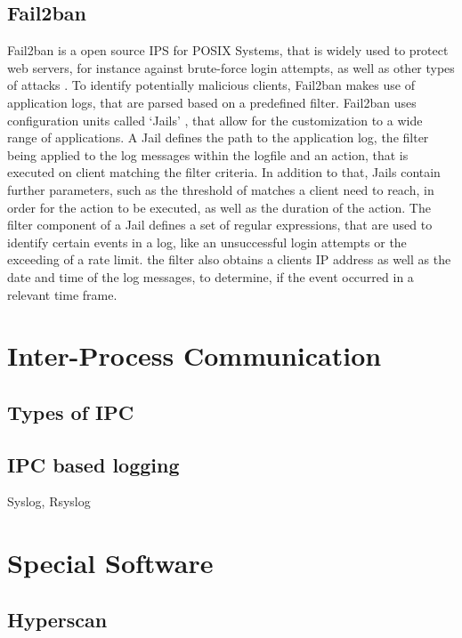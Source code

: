 \subsection{Fail2ban}
\label{sec:fail2ban}

Fail2ban is a open source IPS for POSIX Systems, that is widely used to protect web servers, for instance
against brute-force login attempts, as well as other types of attacks \cite{}. To identify potentially malicious clients,
Fail2ban makes use of application logs, that are parsed based on a predefined filter. Fail2ban uses configuration units called `Jails'  
, that allow for the customization to a wide range of applications. A Jail defines the path to the application log, the filter being applied to the log messages within the logfile and an action, that
is executed on client matching the filter criteria. In addition to that, Jails contain further parameters, such as the threshold of matches a client need to reach, in order for the action to be executed,
as well as the duration of the action. The filter component of a Jail defines a set of regular expressions, that are used to identify certain events in a log, like an unsuccessful login attempts or the 
exceeding of a rate limit. the filter also obtains a clients IP address as well as the date and time of the log messages, to determine, if the event occurred in a relevant time frame. 



\section{Inter-Process Communication}
\label{sec:ipc}

\subsection{Types of IPC}
\label{sec:ipc_types}

\subsection{IPC based logging}

Syslog, Rsyslog

\section{Special Software}
\label{sec:softwar}

\subsection{Hyperscan}
\label{sec:hyperscan}

